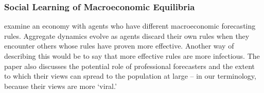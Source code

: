 

\subsubsection{Social Learning of Macroeconomic Equilibria}






\cite{arifovic2018learning} examine an economy with agents who have different macroeconomic forecasting rules.  Aggregate dynamics evolve as agents discard their own rules when they encounter others whose rules have proven more effective.  Another way of describing this would be to say that more effective rules are more infectious.    The paper also discusses the potential role of professional forecasters and the extent to which their views can spread to the population at large -- in our terminology, because their views are more `viral.'

